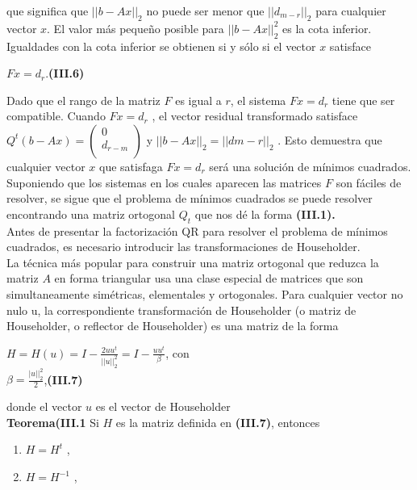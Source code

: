 \documentclass[twocolumn,twoside]{article}
\begin{document}
que significa que $||b-Ax||_{2}$  no puede ser menor que $||d_{m-r} ||_2$  para cualquier vector $x$.
El valor m\'as peque\~no posible para $||b-Ax||_{2}^{2}$ es la cota inferior. Igualdades con la cota
inferior se obtienen si y s\'olo si el vector $x$ satisface
\begin{center}
  $F x = d_r$.\hspace{3cm}\textbf{(III.6)}
\end{center}
Dado que el rango de la matriz $F$ es igual a $r$, el sistema $F x = d_r$ tiene que ser compatible.
Cuando $F x = d_r$ , el vector residual transformado satisface $Q^t(b - A x) = \left(\begin{array}{c}
  0\\ 
  d_{r-m}\\
 \end{array}\right)
$ y $||b - A x||_2 = ||d m-r ||_2$   . Esto demuestra que cualquier vector $x$ que satisfaga $F x = d_r$
ser\'a una soluci\'on de m\'inimos cuadrados. Suponiendo que los sistemas en los cuales
aparecen las matrices $F$ son f\'aciles de resolver, se sigue que el problema de m\'inimos
cuadrados se puede resolver encontrando una matriz ortogonal $Q_t$ que nos d\'e la forma
\textbf{(III.1).}\\
Antes de presentar la factorizaci\'on QR para resolver el problema de m\'inimos
cuadrados, es necesario introducir las transformaciones de Householder.\\
La t\'ecnica m\'as popular para construir una matriz ortogonal que reduzca la matriz $A$
en forma triangular usa una clase especial de matrices que son simultaneamente
sim\'etricas, elementales y ortogonales. Para cualquier vector no nulo u, la correspondiente 
transformaci\'on de Householder (o matriz de Householder, o reflector de
Householder) es una matriz de la forma
\begin{center}
  $H = H(u) = I -  \frac{2uu^t}{||u||_2^2} = I - \frac{uu^t}{\beta}$, con\vspace{0.2cm}\\ 
  $  \beta = \frac{|u||_2^2}{2}  $,\hspace{2cm}\textbf{(III.7)}
\end{center}
donde el vector $u$ es el vector de Householder\\
 \textbf{Teorema(III.1}
Si $H$ es la matriz definida en \textbf{(III.7)}, entonces
\begin{enumerate}[nosep,label=\arabic*)]
  \item $H = H^t$ ,
  \item $H = H^{-1}$ ,
\end{enumerate}
\end{document}
